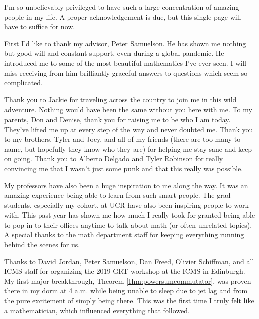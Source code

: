 \begin{acknowledgements}

I'm so unbelievably privileged to have such a large concentration of amazing people in my life. A proper acknowledgement is due, but this single page will have to suffice for now.

First I'd like to thank my advisor, Peter Samuelson. He has shown me nothing but good will and constant support, even during a global pandemic. He introduced me to some of the most beautiful mathematics I've ever seen. I will miss receiving from him brilliantly graceful answers to questions which seem so complicated. 

Thank you to Jackie for traveling across the country to join me in this wild adventure. Nothing would have been the same without you here with me. To my parents, Don and Denise, thank you for raising me to be who I am today. They've lifted me up at every step of the way and never doubted me. Thank you to my brothers, Tyler and Joey, and all of my friends (there are too many to name, but hopefully they know who they are) for helping me stay sane and keep on going. Thank you to Alberto Delgado and Tyler Robinson for really convincing me that I wasn't just some punk and that this really was possible. 

My professors have also been a huge inspiration to me along the way. It was an amazing experience being able to learn from such smart people. The grad students, especially my cohort, at UCR have also been inspiring people to work with. This past year has shown me how much I really took for granted being able to pop in to their offices anytime to talk about math (or often unrelated topics). A special thanks to the math department staff for keeping everything running behind the scenes for us.

Thanks to David Jordan, Peter Samuelson, Dan Freed, Olivier Schiffman, and all ICMS staff for organizing the 2019 GRT workshop at the ICMS in Edinburgh. My first major breakthrough, Theorem \ref{thm:powersumcommutator}, was proven there in my dorm at 4 a.m. while being unable to sleep due to jet lag and from the pure excitement of simply being there. This was the first time I truly felt like a mathematician, which influenced everything that followed.
\end{acknowledgements}
